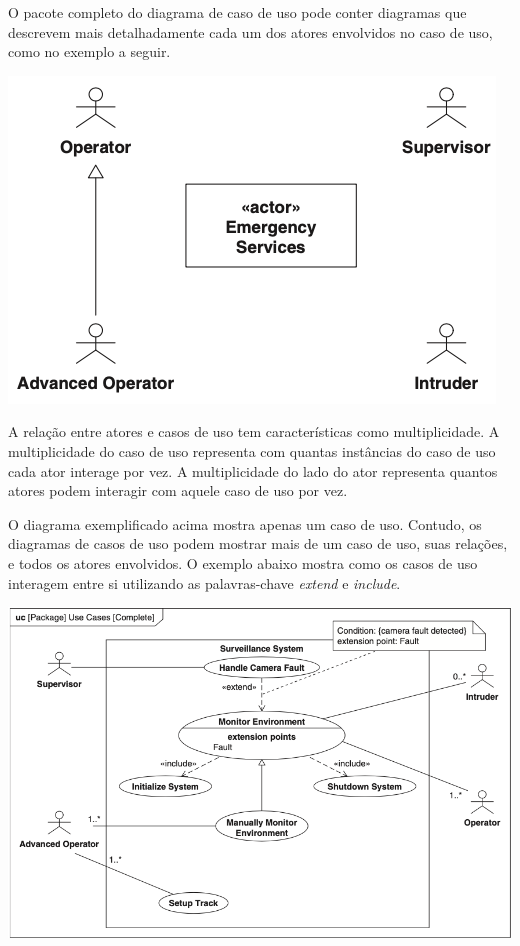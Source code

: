 O pacote completo do diagrama de caso de uso pode conter diagramas que descrevem mais detalhadamente cada um dos atores envolvidos no caso de uso, como no exemplo a seguir.

\includegraphics[width=\textwidth,height=\textheight,keepaspectratio]{figures/diagrama-caso-de-uso-2.png}

A relação entre atores e casos de uso tem características como multiplicidade. A multiplicidade do caso de uso representa com quantas instâncias do caso de uso cada ator interage por vez. A multiplicidade do lado do ator representa quantos atores podem interagir com aquele caso de uso por vez.

O diagrama exemplificado acima mostra apenas um caso de uso. Contudo, os diagramas de casos de uso podem mostrar mais de um caso de uso, suas relações, e todos os atores envolvidos. O exemplo abaixo mostra como os casos de uso interagem entre si utilizando as palavras-chave \textit{extend} e \textit{include}.

\includegraphics[width=\textwidth,height=\textheight,keepaspectratio]{figures/diagrama-caso-de-uso-3.png}

